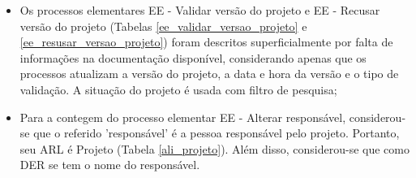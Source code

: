 \begin{itemize}
   \item Os processos elementares EE - Validar versão do projeto e EE - Recusar versão do projeto 
    (Tabelas \ref{ee_validar_versao_projeto} e \ref{ee_resusar_versao_projeto}) foram descritos superficialmente por falta de informações
    na documentação disponível, considerando apenas que os processos atualizam a versão do projeto, a data e hora da versão e o tipo 
    de validação. A situação do projeto é usada com filtro de pesquisa;
    
   \item Para a contegem do processo elementar EE - Alterar responsável, considerou-se que o referido 'responsável' é a pessoa
   responsável pelo projeto. Portanto, seu ARL é Projeto (Tabela \ref{ali_projeto}). Além disso, considerou-se que como DER se tem o 
   nome do responsável.
   
  \end{itemize}

